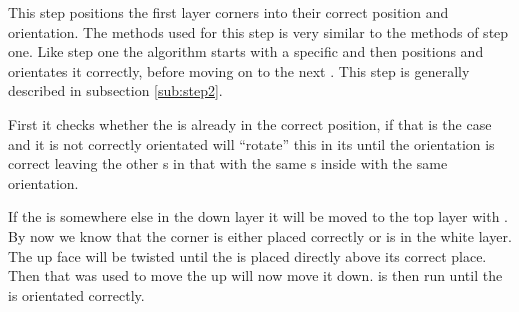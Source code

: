 This step positions the first layer corners into their correct position and orientation. The methods used for this step is very similar to the methods of step one. 
Like step one the algorithm starts with a specific \cpiece{} and then positions and orientates it correctly, before moving on to the next \cpiece. 
This step is generally described in subsection \ref{sub:step2}.

First it checks whether the \cubie{} is already in the correct position, if that is the case and it is not correctly orientated  will ``rotate'' this \cpiece{} in its \cubicle{} until the orientation is correct leaving the other \cubicle{}s in that \face{} with the same \cubie{}s inside with the same orientation. 

If the \cpiece{} is somewhere else in the down layer it will be moved to the top layer with . 
By now we know that the corner \cpiece{} is either placed correctly or is in the white layer. 
The up face will be twisted until the \cpiece{} is placed directly above its correct place. 
Then  that was used to move the \cpiece{} up will now move it down. 
 is then run until the \cpiece{} is orientated correctly.